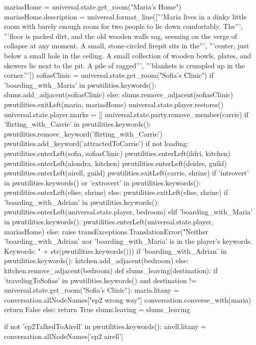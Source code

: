 \documentclass{book}
\begin{document}
\begin{openScene}
    mariasHome = universal.state.get_room("Maria's Home")
    mariasHome.description = universal.format_line(['''Maria lives in a dinky little room with barely enough room for two people to lie down comfortably. The''',
    '''floor is packed dirt, and the old wooden walls sag, seeming on the verge of collapse at any moment. A small, stone-circled firepit sits in the''',
    '''center, just below a small hole in the ceiling. A small collection of wooden bowls, plates, and  skewers lie next to the pit. A pile of ragged''',
    '''blankets is crumpled up in the corner.'''])
    sofiasClinic = universal.state.get_room("Sofia's Clinic")
    if 'boarding_with_Maria' in pwutilities.keywords():
        slums.add_adjacent(sofiasClinic)
    else:
        slums.remove_adjacent(sofiasClinic)
        pwutilities.exitLeft(maria, mariasHome)
    universal.state.player.restores()
    universal.state.player.marks = []
    universal.state.party.remove_member(carrie)
    if 'flirting_with_Carrie' in pwutilities.keywords():
        pwutilities.remove_keyword('flirting_with_Carrie')
        pwutilities.add_keyword('attractedToCarrie')
    if not loading:
        pwutilities.enterLeft(sofia, sofiasClinic)
        pwutilities.enterLeft(ildri, kitchen)
        pwutilities.enterLeft(alondra, kitchen)
        pwutilities.enterLeft(deidre, guild)
        pwutilities.enterLeft(airell, guild)
        pwutilities.exitLeft(carrie, shrine)
        if 'introvert' in pwutilities.keywords() or 'extrovert' in pwutilities.keywords():
            pwutilities.enterLeft(elise, shrine)
        else:
            pwutilities.exitLeft(elise, shrine)
        if 'boarding_with_Adrian' in pwutilities.keywords():
            pwutilities.enterLeft(universal.state.player, bedroom)
        elif 'boarding_with_Maria' in pwutilities.keywords():
            pwutilities.enterLeft(universal.state.player, mariasHome)
        else:
            raise transExceptions.TranslationError("Neither 'boarding_with_Adrian' nor 'boarding_with_Maria' is in the player's keywords. Keywords: " + str(pwutilities.keywords()))
    if 'boarding_with_Adrian' in pwutilities.keywords():
        kitchen.add_adjacent(bedroom)
    else:
        kitchen.remove_adjacent(bedroom)
    def slums_leaving(destination):
        if 'travelingToSofias' in pwutilities.keywords() and destination != universal.state.get_room("Sofia's Clinic"):
            maria.litany = conversation.allNodeNames["ep2 wrong way"]
            conversation.converse_with(maria)
            return False
        else:
            return True
    slums.leaving = slums_leaving

    if not 'ep2TalkedToAirell' in pwutilities.keywords():
        airell.litany = conversation.allNodeNames['ep2 airell']
    
\end{openScene}
\end{document}
